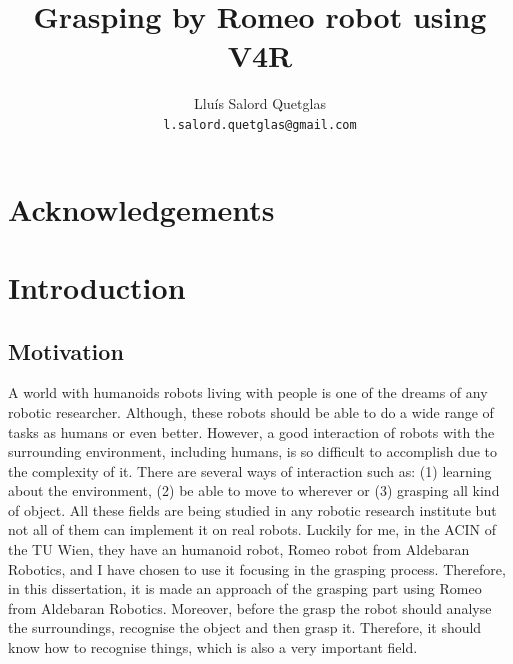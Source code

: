 \documentclass[12pt,a4paper,final,twoside,openright]{report}
\title{Grasping by Romeo robot using V4R}
\author{Lluís Salord Quetglas\\
		\texttt{l.salord.quetglas@gmail.com}\\}
\date{Technischen Universität Wien (TU Wien)\\
Automation and Control Institute (ACIN)\\
\paragraph{} 
Master Thesis Project\\
\paragraph{}
\today} %
\begin{document}
\maketitle
\thispagestyle{empty}

\cleardoublepage


\begin{abstract}

\end{abstract}

\tableofcontents
\newpage
\listoffigures
\newpage
\listoftables
\newpage

\chapter*{Acknowledgements}


\chapter{Introduction}

\section{Motivation}

A world with humanoids robots living with people is one of the dreams of any robotic researcher. Although, these robots should be able to do a wide range of tasks as humans or even better. However, a good interaction of robots with the surrounding environment, including humans, is so difficult to accomplish due to the complexity of it. There are several ways of interaction such as: (1) learning about the environment, (2) be able to move to wherever or (3) grasping all kind of object. All these fields are being studied in any robotic research institute but not all of them can implement it on real robots. Luckily for me, in the ACIN of the TU Wien, they have an humanoid robot, Romeo robot from Aldebaran Robotics, and I have chosen to use it focusing in the grasping process. Therefore, in this dissertation, it is made an approach of the grasping part using Romeo from Aldebaran Robotics. Moreover, before the grasp the robot should analyse the surroundings, recognise the object and then grasp it. Therefore, it should know how to recognise things, which is also a very important field.  
\end{document}
